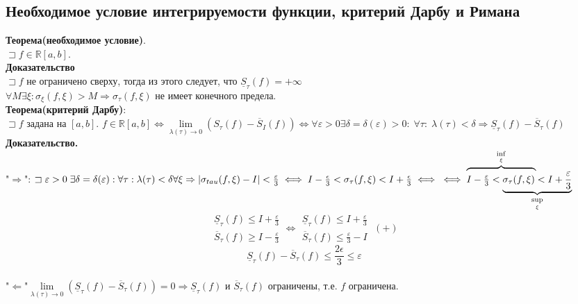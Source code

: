 \documentclass[14pt]{article}
\begin{document}
	\subsection{Необходимое условие интегрируемости функции, критерий Дарбу и Римана}
	\textbf{Теорема(необходимое условие)}. \\
	$\sqsupset f \in \mathbb{R} [a,b]$. \\
	\textbf{Доказательство} \\
	$\sqsupset f$ не ограничено сверху, тогда из этого следует, что $\underline{S}_{\tau}(f)=+\infty$ \\
	$\forall M \exists \xi: \sigma_{\xi}(f,\xi)>M \Rightarrow \sigma_{\tau}(f,\xi)$ не имеет конечного предела. \\
	\textbf{Теорема(критерий Дарбу)}: \\
	$\sqsupset f$ задана на $[a,b]$. $f \in \mathbb{R}[a,b] \iff \lim\limits_{\lambda(\tau)\rightarrow 0}(S_{\tau}(f)-\overline{S}_{I}(f)) \iff \forall \varepsilon > 0 \exists \delta=\delta(\varepsilon)>0: \; \forall \tau: \; \lambda(\tau)<\delta \Rightarrow \underline{S}_{\tau}(f)-\overline{S}_{\tau}(f)$ \\
	\textbf{Доказательство.}  \\
	"$\Rightarrow$": $\sqsupset \varepsilon>0 \; \exists \delta=\delta(\varepsilon): \forall \tau: \lambda(\tau) < \delta \forall \xi \Rightarrow |\sigma_{tau}(f,\xi)-I|<\frac{\varepsilon}{3} \iff I - \frac{\epsilon}{3}<\sigma_{\tau}(f,\xi)<I+\frac{\epsilon}{3} \iff  \\ \iff
	\lefteqn{
		\overbrace{
				\phantom{
						I-\frac{\varepsilon}{3}<\sigma_{\tau}(f,\xi)
						}
				 }^{\underset{\xi}{\inf}}
			}
		I-\frac{\varepsilon}{3}<\underbrace{\sigma_{\tau}(f,\xi)<I+\frac{\varepsilon}{3}}_{\underset{\xi}{\sup}}$ \\
		$$\begin{gathered}\underline{S}_{\tau}(f)\leqslant I+\frac{\varepsilon}{3} \\ \overline{S}_{\tau}(f)\geqslant I-\frac{\varepsilon}{3}
		\end{gathered} \iff \begin{gathered}
		\underline{S}_{\tau}(f)\leqslant I+\frac{\varepsilon}{3} \\
		\overline{S}_{\tau}(f)\leqslant\frac{\varepsilon}{3}-I
	\end{gathered} \; (+)$$ 
	$$\boxed{\underline{S}_{\tau}(f)-\overline{S}_{\tau}(f)\leqslant\frac{2\epsilon}{3}\leqslant\varepsilon}$$ \\
	"$\Leftarrow$"$ \lim\limits_{\lambda(\tau)\rightarrow 0}(\underline{S}_{\tau}(f)-\overline{S}_{\tau}(f))=0 \Rightarrow \underline{S}_{\tau}(f)$ и $\overline{S}_{\tau}(f)$ ограничены, т.е. $f$ ограничена. \\
\end{document}
